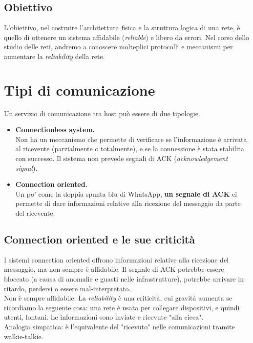 \subsection{Obiettivo}
L'obiettivo, nel costruire l'architettura fisica e la struttura logica di una rete, è quello di ottenere un sistema affidabile (\textit{reliable}) e libero da errori. Nel corso dello studio delle reti, andremo a conoscere molteplici protocolli e meccanismi per aumentare la \textit{reliability} della rete.

\newpage

\section{Tipi di comunicazione}
Un servizio di comunicazione tra host può essere di due tipologie. 
\begin{itemize}
    \item \textbf{Connectionless system.}\\
    Non ha un meccanismo che permette di verificare se l'informazione è arrivata al ricevente (parzialmente o totalmente), e se la connessione è stata stabilita con successo. Il sistema non prevede segnali di ACK (\textit{acknowledgement signal}).
    \item \textbf{Connection oriented.}\\
    Un po' come la doppia spunta blu di WhatsApp, \textbf{un segnale di ACK} ci permette di dare informazioni relative alla ricezione del messaggio da parte del ricevente.
\end{itemize}

\subsection{Connection oriented e le sue criticità}
I sistemi connection oriented offrono informazioni relative alla ricezione del messaggio, ma non sempre è affidabile. Il segnale di ACK potrebbe essere bloccato (a causa di anomalie e guasti nelle infrastrutture), potrebbe arrivare in ritardo, perdersi o essere mal-interpretato.\\
Non è sempre affidabile. La \textit{reliability} è una criticità, cui gravità aumenta se ricordiamo la seguente cosa: una rete è usata per collegare dispositivi, e quindi utenti, lontani. Le informazioni sono inviate e ricevute "alla cieca".\\ 
Analogia simpatica: è l'equivalente del "ricevuto" nelle comunicazioni tramite walkie-talkie.

